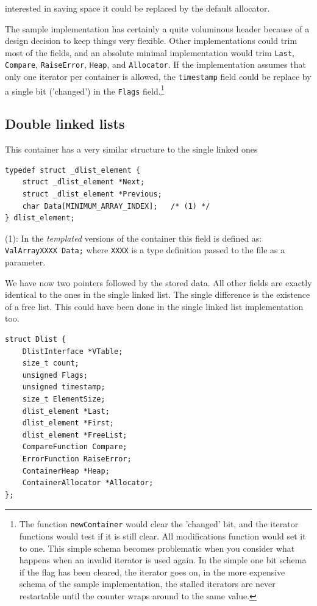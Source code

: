 \documentclass[12pt,a4paper]{memoir} %
\begin{document}
{{\begin{enumerate}
interested in saving space it could be replaced by the default allocator.
\end{enumerate}
The sample implementation has certainly a quite voluminous header because of a design decision to keep things very flexible. Other implementations 
could trim most of the fields, and an absolute minimal implementation would trim \texttt{Last}, \texttt{Compare}, \texttt{RaiseError}, \texttt{Heap}, 
and \texttt{Allocator}. If the implementation assumes that only one iterator per container is allowed, the \texttt{timestamp} field could be replace by 
a single bit ('changed') in the \texttt{Flags} field.\footnote{The function \texttt{newContainer} would clear the 'changed' bit, and the iterator 
functions would test if it is still clear. All modifications function would set it to one. This simple schema becomes problematic when you consider 
what happens when an invalid iterator is used again. In the simple one bit schema if the flag has been cleared, the iterator goes on, in the more 
expensive schema of the sample  implementation, the stalled iterators are never restartable until the counter wraps around to the same value.}
\subsection{Double linked lists}
This container has a very similar structure to the single linked ones
\begin{verbatim}
typedef struct _dlist_element {
    struct _dlist_element *Next;
	struct _dlist_element *Previous;
    char Data[MINIMUM_ARRAY_INDEX];   /* (1) */
} dlist_element;
\end{verbatim}

(1): In the \textsl{templated} versions of the container this field is defined as: \verb,ValArrayXXXX Data;, where \verb,XXXX, is a type 
definition passed to the file as a parameter.

We have now two pointers followed by the stored data. All other fields are exactly identical to the ones in the single linked list. The single 
difference is the existence of a free list. This could have been done in the single linked list implementation too.
\begin{verbatim}
struct Dlist {
    DlistInterface *VTable;
    size_t count;        
    unsigned Flags;
    unsigned timestamp;
    size_t ElementSize;
    dlist_element *Last; 
    dlist_element *First;
    dlist_element *FreeList;
    CompareFunction Compare;
    ErrorFunction RaiseError; 
    ContainerHeap *Heap;
    ContainerAllocator *Allocator;
};
\end{verbatim}

}}
\end{document}
